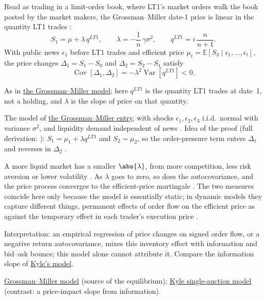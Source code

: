\begin{qfresult}\label{res:grossman-miller-liquidity-measures}
 Read as trading in a limit-order book, where LT1's market orders walk the book posted by the market makers, the Grossman--Miller date-1 price is linear in the quantity LT1 trades \citep[chap.~``A Primer on the Microstructure of Financial Markets'', pp.~26--27]{crypto-cartea}:
\[ S_1=\mu+\lambda\,q^{LT1}, \qquad \lambda=-\frac{1}{n}\,\gamma\sigma^2, \qquad q^{LT1}=i\,\frac{n}{n+1}. \]
With public news $\epsilon_1$ before LT1 trades and efficient price $\mu_t=\mathbb{E}[S_3\mid\epsilon_1,\ldots,\epsilon_t]$, the price changes $\Delta_1=S_1-S_0$ and $\Delta_2=S_2-S_1$ satisfy \citep[same chap., pp.~27--28]{crypto-cartea}
\[ \operatorname{Cov}[\Delta_1,\Delta_2]=-\lambda^2\operatorname{Var}[q^{LT1}]<0. \]

 As in \hyperref[mod:grossman-miller]{the Grossman--Miller model}; here $q^{LT1}$ is the quantity LT1 trades at date~1, not a holding, and $\lambda$ is the slope of price on that quantity.

 The model of \hyperref[mod:grossman-miller]{the Grossman--Miller entry}, with shocks $\epsilon_1,\epsilon_2,\epsilon_3$ i.i.d.\ normal with variance $\sigma^2$, and liquidity demand independent of news \citep[same chap., pp.~27--28]{crypto-cartea}. Idea of the proof (full derivation: ): $S_1=\mu_1+\lambda q^{LT1}$ and $S_2=\mu_2$, so the order-pressure term enters $\Delta_1$ and reverses in $\Delta_2$ \citep[same chap., p.~28]{crypto-cartea}.

 A more liquid market has a smaller $\abs{\lambda}$, from more competition, less risk aversion or lower volatility \citep[same chap., p.~27]{crypto-cartea}. As $\lambda$ goes to zero, so does the autocovariance, and the price process converges to the efficient-price martingale \citep[same chap., p.~28]{crypto-cartea}. The two measures coincide here only because the model is essentially static; in dynamic models they capture different things, permanent effects of order flow on the efficient price as against the temporary effect in each trader's execution price \citep[same chap., p.~28]{crypto-cartea}.

 Interpretation: an empirical regression of price changes on signed order flow, or a negative return autocovariance, mixes this inventory effect with information and bid--ask bounce; this model alone cannot attribute it. Compare the information slope of \hyperref[mod:kyle-single-auction]{Kyle's model}.

 \hyperref[mod:grossman-miller]{Grossman--Miller model} (source of the equilibrium); \hyperref[mod:kyle-single-auction]{Kyle single-auction model} (contrast: a price-impact slope from information).

\end{qfresult}

